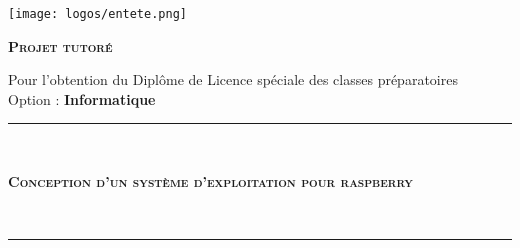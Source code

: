 \documentclass[12pt,a4paper,oneside]{book}
\begin{document}
	\frontmatter
	\begin{titlepage}	
		\centering %
		\texttt{[image: logos/entete.png]}\par\vspace{1cm} %
		\vspace{1.5cm}%
		\begin{center}
			\textsc{\large{\textbf{Projet tutoré}}} 
		\end{center}
		\begin{center}
			Pour l'obtention du Diplôme de Licence spéciale des classes préparatoires\\ Option : \textbf{Informatique}
		\end{center}
		\vspace{1cm}%
		\rule{\linewidth}{0.2 mm} \\[0.4 cm]
		\begin{center}
			\bfseries\large{\scshape{Conception d'un système d'exploitation pour raspberry }}
		\end{center} \ %
		\rule{\linewidth}{0.2 mm} \\[1.5 cm]
		\vspace{1cm}%
		

\end{titlepage}
\end{document}
